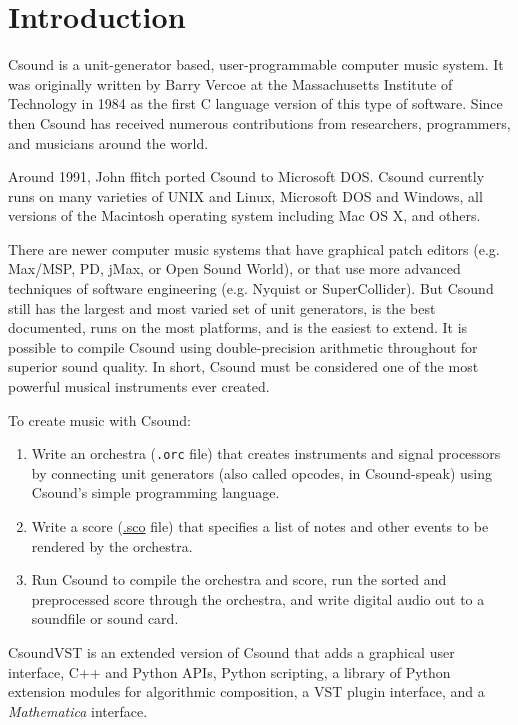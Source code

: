 \documentclass[10pt,letterpaper,onecolumn]{book}
\begin{document}
\setcounter{secnumdepth}{2}    

\mainmatter

\setcounter{page}{1}

\chapter{Introduction}

Csound is a unit-generator based, user-programmable computer music system. It was originally written by Barry Vercoe at the Massachusetts Institute of Technology in 1984 as the first C language version of this type of software. Since then Csound has received numerous contributions from researchers, programmers, and musicians around the world. 

Around 1991, John ffitch ported Csound to Microsoft DOS. Csound currently runs on many varieties of UNIX and Linux, Microsoft DOS and Windows, all versions of the Macintosh operating system including Mac OS X, and others.

There are newer computer music systems that have graphical patch editors (e.g. Max/MSP, PD, jMax, or Open Sound World), or that use more advanced techniques of software engineering (e.g. Nyquist or SuperCollider). But Csound still has the largest and most varied set of unit generators, is the best documented, runs on the most platforms, and is the easiest to extend. It is possible to compile Csound using double-precision arithmetic throughout for superior sound quality. In short, Csound must be considered one of the most powerful musical instruments ever created.

To create music with Csound:

\begin{enumerate}
\item Write an orchestra (\texttt{.orc} file) that creates instruments and signal processors by connecting unit generators (also called opcodes, in Csound-speak) using Csound's simple programming language.
\item Write a score (\url{.sco} file) that specifies a list of notes and other events to be rendered by the orchestra.
\item Run Csound to compile the orchestra and score, run the sorted and preprocessed score through the orchestra, and write digital audio out to a soundfile or sound card.
\end{enumerate}

CsoundVST is an extended version of Csound that adds a graphical user interface, C++ and Python APIs, Python scripting, a library of Python extension modules for algorithmic composition, a VST plugin interface, and a \emph{Mathematica} interface.
\end{document}
